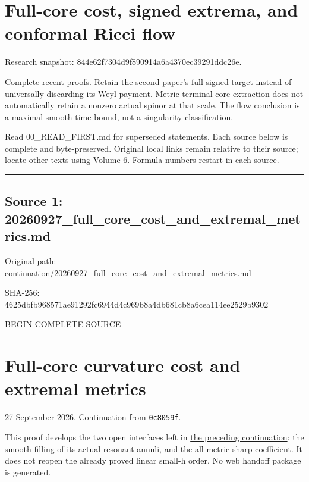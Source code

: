 \documentclass[
  10pt,
]{article}
\author{}
\date{}
\begin{document}
\hypertarget{full-core-cost-signed-extrema-and-conformal-ricci-flow}{%
\section{Full-core cost, signed extrema, and conformal Ricci
flow}\label{full-core-cost-signed-extrema-and-conformal-ricci-flow}}

Research snapshot: 844e62f7304d9f890914a6a4370ec39291ddc26e.

Complete recent proofs. Retain the second paper's full signed target
instead of universally discarding its Weyl payment. Metric terminal-core
extraction does not automatically retain a nonzero actual spinor at that
scale. The flow conclusion is a maximal smooth-time bound, not a
singularity classification.

Read 00\_READ\_FIRST.md for superseded statements. Each source below is
complete and byte-preserved. Original local links remain relative to
their source; locate other texts using Volume 6. Formula numbers restart
in each source.

\begin{center}\rule{0.5\linewidth}{0.5pt}\end{center}

\hypertarget{source-1-20260927_full_core_cost_and_extremal_metrics.md}{%
\subsection{Source 1:
20260927\_full\_core\_cost\_and\_extremal\_metrics.md}\label{source-1-20260927_full_core_cost_and_extremal_metrics.md}}

Original path:
continuation/20260927\_full\_core\_cost\_and\_extremal\_metrics.md

SHA-256:
4625dbfb968571ae91292fc6944d4c969b8a4db681cb8a6cea114ee2529b9302

BEGIN COMPLETE SOURCE

\hypertarget{full-core-curvature-cost-and-extremal-metrics}{%
\section{Full-core curvature cost and extremal
metrics}\label{full-core-curvature-cost-and-extremal-metrics}}

27 September 2026. Continuation from \texttt{0c8059f}.

This proof develops the two open interfaces left in
\href{20260927_local_geometry_and_variational_extrema.md}{the preceding
continuation}: the smooth filling of its actual resonant annuli, and the
all-metric sharp coefficient. It does not reopen the already proved
linear small-h order. No web handoff package is generated.
\end{document}
